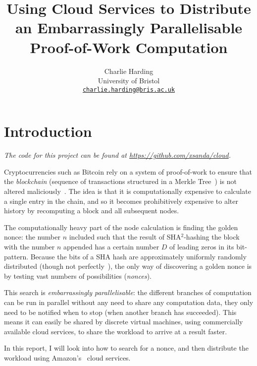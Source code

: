 \documentclass[letterpaper,twocolumn,11pt]{article}
\begin{document}
\title{Using Cloud Services to Distribute an Embarrassingly Parallelisable Proof-of-Work Computation}

\author{
{\rm Charlie Harding}\\
University of Bristol\\
\href{mailto:charlie.harding@bris.ac.uk}{\nolinkurl{charlie.harding@bris.ac.uk}}
}

\maketitle

\tableofcontents

\section{Introduction}

\textit{The code for this project can be found at \url{https://github.com/xsanda/cloud}.}

Cryptocurrencies such as Bitcoin rely on a system of proof-of-work to ensure that the \textit{blockchain} (sequence of transactions structured in a Merkle Tree~\cite{blockonomi_2018}) is not altered maliciously~\cite{bitcoin}. The idea is that it is computationally expensive to calculate a single entry in the chain, and so it becomes prohibitively expensive to alter history by recomputing a block and all subsequent nodes.

The computationally heavy part of the node calculation is finding the golden nonce: the number $n$ included such that the result of SHA$^2$-hashing the block with the number $n$ appended has a certain number $D$ of leading zeros in its bit-pattern. Because the bits of a SHA hash are approximately uniformly randomly distributed (though not perfectly~\cite{cryptoeprint:2008:441}), the only way of discovering a golden nonce is by testing vast numbers of possibilities (\textit{nonces}).

This search is \textit{embarrassingly parallelisable}: the different branches of computation can be run in parallel without any need to share any computation data, they only need to be notified when to stop (when another branch has succeeded). This means it can easily be shared by discrete virtual machines, using commercially available cloud services, to share the workload to arrive at a result faster.

In this report, I will look into how to search for a nonce, and then distribute the workload using Amazon's~\cite{aws} cloud services.
\end{document}
